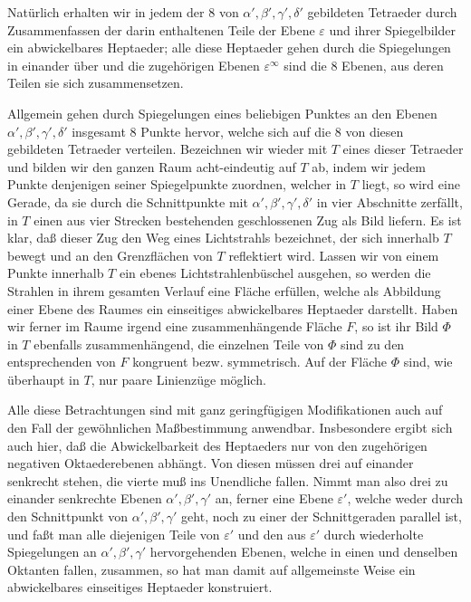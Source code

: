\documentclass[11pt,a4paper]{article}
\begin{document}
Nat\"urlich erhalten wir in jedem der $8$ von $\alpha',\beta',\gamma',\delta'$ gebildeten Tetraeder durch Zusammenfassen der darin enthaltenen Teile der Ebene $\varepsilon$ und ihrer Spiegelbilder ein abwickelbares Heptaeder; alle diese Heptaeder gehen durch die Spiegelungen in einander \"uber und die zugeh\"origen Ebenen $\varepsilon^\infty$ sind die $8$ Ebenen, aus deren Teilen sie sich zusammensetzen.

Allgemein gehen durch Spiegelungen eines beliebigen Punktes an den Ebenen $\alpha',\beta',\gamma',\delta'$ insgesamt $8$ Punkte hervor, welche sich auf die $8$ von diesen gebildeten Tetraeder verteilen. Bezeichnen wir wieder mit $T$ eines dieser Tetraeder und bilden wir den ganzen Raum acht-eindeutig auf $T$ ab, indem wir jedem Punkte denjenigen seiner Spiegelpunkte zuordnen, welcher in $T$ liegt, so wird eine Gerade, da sie durch die Schnittpunkte mit $\alpha',\beta',\gamma',\delta'$ in vier Abschnitte zerf\"allt, in $T$ einen aus vier Strecken bestehenden geschlossenen Zug als Bild liefern. Es ist klar, da\ss{} dieser Zug den Weg eines Lichtstrahls bezeichnet, der sich innerhalb $T$ bewegt und an den Grenzfl\"achen von $T$ reflektiert wird. Lassen wir von einem Punkte innerhalb $T$ ein ebenes Lichtstrahlenb\"uschel ausgehen, so werden die Strahlen in ihrem gesamten Verlauf eine Fl\"ache erf\"ullen, welche als Abbildung einer Ebene des Raumes ein einseitiges abwickelbares Heptaeder darstellt. Haben wir ferner im Raume irgend eine zusammenh\"angende Fl\"ache $F$, so ist ihr Bild $\Phi$ in $T$ ebenfalls zusammenh\"angend, die einzelnen Teile von $\Phi$ sind zu den entsprechenden von $F$ kongruent bezw. symmetrisch. Auf der Fl\"ache $\Phi$ sind, wie \"uberhaupt in $T$, nur paare Linienz\"uge m\"oglich.

Alle diese Betrachtungen sind mit ganz geringf\"ugigen Modifikationen auch auf den Fall der gew\"ohnlichen Ma\ss{}bestimmung anwendbar. Insbesondere ergibt sich auch hier, da\ss{} die Abwickelbarkeit des Heptaeders nur von den zugeh\"origen negativen Oktaederebenen abh\"angt. Von diesen m\"ussen drei auf einander senkrecht stehen, die vierte mu\ss{} ins Unendliche fallen. Nimmt man also drei zu einander senkrechte Ebenen $\alpha',\beta',\gamma'$ an, ferner eine Ebene $\varepsilon'$, welche weder durch den Schnittpunkt von $\alpha',\beta',\gamma'$ geht, noch zu einer der Schnittgeraden parallel ist, und fa\ss{}t man alle diejenigen Teile von $\varepsilon'$ und den aus $\varepsilon'$ durch wiederholte Spiegelungen an $\alpha',\beta',\gamma'$ hervorgehenden Ebenen, welche in einen und denselben Oktanten fallen, zusammen, so hat man damit auf allgemeinste Weise ein abwickelbares einseitiges Heptaeder konstruiert.
\end{document}
